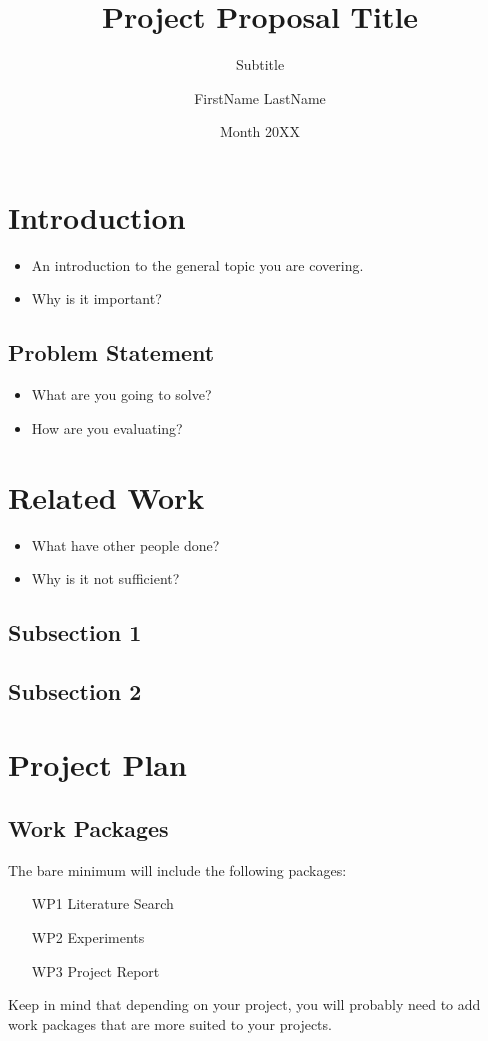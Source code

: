 \documentclass{proposal_style_template} %
\title{Project Proposal Title}
\subtitle{Subtitle}
\author{FirstName LastName}
\date{Month 20XX}
\begin{document}
\maketitle

\pagestyle{plain}

\section{Introduction}
\begin{itemize}
    \item An introduction to the general topic you are covering.
    \item Why is it important?
\end{itemize}

\subsection{Problem Statement}
\begin{itemize}
    \item What are you going to solve?
    \item How are you evaluating?
\end{itemize}


\section{Related Work}
\begin{itemize}
    \item What have other people done?
    \item Why is it not sufficient?
\end{itemize}

\subsection{Subsection 1}
\subsection{Subsection 2}



\section{Project Plan}

\subsection{Work Packages}
The bare minimum will include the following packages:
\begin{enumerate}
    \item[WP1] Literature Search
    \item[WP2] Experiments
    \item[WP3] Project Report
\end{enumerate}
Keep in mind that depending on your project, you will probably need to add work packages that are more suited to your projects.
\end{document}
